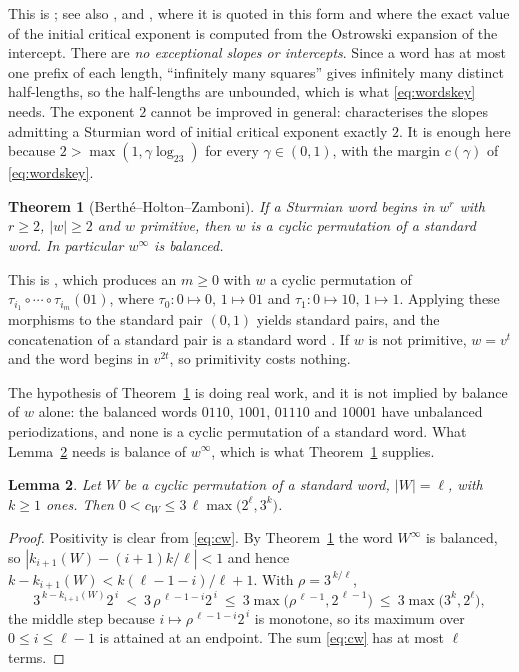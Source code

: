 \documentclass[11pt,reqno]{amsart}
\theoremstyle{plain}
\newtheorem{theorem}{Theorem}[section]
\newtheorem{lemma}[theorem]{Lemma}
\theoremstyle{definition}
\begin{document}
This is \cite[Theorem~1]{ADQZ2001}; see also \cite{DamanikKillipLenz2000}, and
\cite[\S1]{BertheHoltonZamboni2006}, where it is quoted in this form and where
the exact value of the initial critical exponent is computed from the Ostrowski
expansion of the intercept. There are \emph{no exceptional slopes or
intercepts}. Since a word has at most one prefix of each length, ``infinitely
many squares'' gives infinitely many distinct half-lengths, so the half-lengths
are unbounded, which is what \eqref{eq:wordskey} needs. The exponent $2$ cannot
be improved in general: \cite[Theorem~1.1]{BertheHoltonZamboni2006} characterises
the slopes admitting a Sturmian word of initial critical exponent exactly $2$.
It is enough here because $2>\max(1,\gamma\log_23)$ for every
$\gamma\in(0,1)$, with the margin $c(\gamma)$ of \eqref{eq:wordskey}.

\begin{theorem}[Berth\'e--Holton--Zamboni]\label{thm:roots}
If a Sturmian word begins in $w^{r}$ with $r\ge2$, $|w|\ge2$ and $w$ primitive,
then $w$ is a cyclic permutation of a standard word. In particular $w^{\infty}$
is balanced.
\end{theorem}

This is \cite[Proposition~3.2]{BertheHoltonZamboni2006}, which produces an
$m\ge0$ with $w$ a cyclic permutation of
$\tau_{i_1}\circ\cdots\circ\tau_{i_m}(01)$, where $\tau_0:0\mapsto0,\,1\mapsto01$
and $\tau_1:0\mapsto10,\,1\mapsto1$. Applying these morphisms to the standard
pair $(0,1)$ yields standard pairs, and the concatenation of a standard pair is a
standard word \cite[Ch.~2]{Lothaire2002}. If $w$ is not primitive, $w=v^{t}$ and
the word begins in $v^{2t}$, so primitivity costs nothing.

The hypothesis of Theorem~\ref{thm:roots} is doing real work, and it is not
implied by balance of $w$ alone: the balanced words $0110$, $1001$, $01110$ and
$10001$ have unbalanced periodizations, and none is a cyclic permutation of a
standard word. What Lemma~\ref{lem:conjheight} needs is balance of $w^{\infty}$,
which is what Theorem~\ref{thm:roots} supplies.

\begin{lemma}\label{lem:conjheight}
Let $W$ be a cyclic permutation of a standard word, $|W|=\ell$, with $k\ge1$
ones. Then $0<c_W\le 3\,\ell\max\bigl(2^{\ell},3^{k}\bigr)$.
\end{lemma}

\begin{proof}
Positivity is clear from \eqref{eq:cw}. By Theorem~\ref{thm:roots} the word
$W^{\infty}$ is balanced, so $|k_{i+1}(W)-(i+1)k/\ell|<1$ and hence
$k-k_{i+1}(W)<k(\ell-1-i)/\ell+1$. With $\rho=3^{\,k/\ell}$,
\[
3^{\,k-k_{i+1}(W)}2^{\,i}\ <\ 3\,\rho^{\,\ell-1-i}2^{\,i}
\ \le\ 3\max\bigl(\rho^{\,\ell-1},2^{\,\ell-1}\bigr)\ \le\ 3\max\bigl(3^{k},2^{\ell}\bigr),
\]
the middle step because $i\mapsto\rho^{\,\ell-1-i}2^{\,i}$ is monotone, so its
maximum over $0\le i\le\ell-1$ is attained at an endpoint. The sum \eqref{eq:cw}
has at most $\ell$ terms.
\end{proof}
\end{document}
